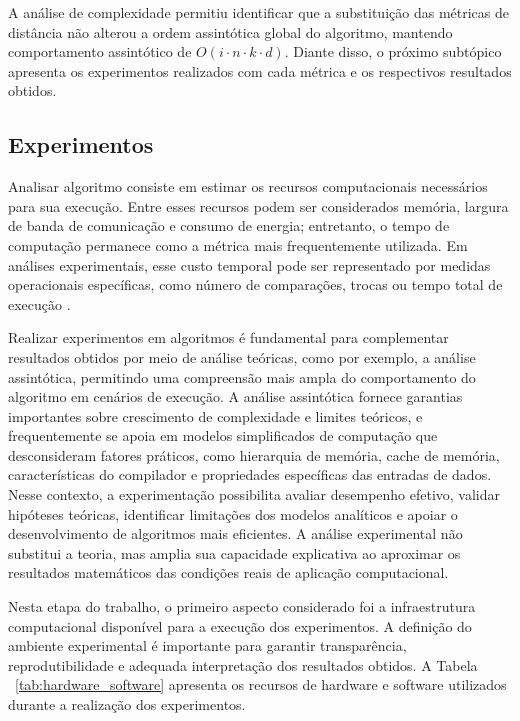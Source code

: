 \documentclass[10pt,a4paper,twocolumn]{article}
\begin{document}
A análise de complexidade permitiu identificar que a substituição das métricas de distância não alterou a ordem assintótica global do algoritmo, mantendo comportamento assintótico de $O(i \cdot n \cdot k \cdot d)$. Diante disso, o próximo subtópico apresenta os experimentos realizados com cada métrica e os respectivos resultados obtidos.



\subsection{Experimentos}

Analisar algoritmo consiste em estimar os recursos computacionais necessários para sua execução. Entre esses recursos podem ser considerados memória, largura de banda de comunicação e consumo de energia; entretanto, o tempo de computação permanece como a métrica mais frequentemente utilizada. Em análises experimentais, esse custo temporal pode ser representado por medidas operacionais específicas, como número de comparações, trocas ou tempo total de execução \cite{Cormen2024}. 

Realizar experimentos em algoritmos é fundamental para complementar resultados obtidos por meio de análise teóricas, como por exemplo, a análise assintótica, permitindo uma compreensão mais ampla do comportamento do algoritmo em cenários de execução. A análise assintótica fornece garantias importantes sobre crescimento de complexidade e limites teóricos, e frequentemente se apoia em modelos simplificados de computação que desconsideram fatores práticos, como hierarquia de memória, cache de memória, características do compilador e propriedades específicas das entradas de dados. Nesse contexto, a experimentação possibilita avaliar desempenho efetivo, validar hipóteses teóricas, identificar limitações dos modelos analíticos e apoiar o desenvolvimento de algoritmos mais eficientes. A análise experimental não substitui a teoria, mas amplia sua capacidade explicativa ao aproximar os resultados matemáticos das condições reais de aplicação computacional\cite{McGeoch2001}.

Nesta etapa do trabalho, o primeiro aspecto considerado foi a infraestrutura computacional disponível para a execução dos experimentos. A definição do ambiente experimental é importante para garantir transparência, reprodutibilidade e adequada interpretação dos resultados obtidos. A Tabela ~\ref{tab:hardware_software} apresenta os recursos de hardware e software utilizados durante a realização dos experimentos.
\end{document}
